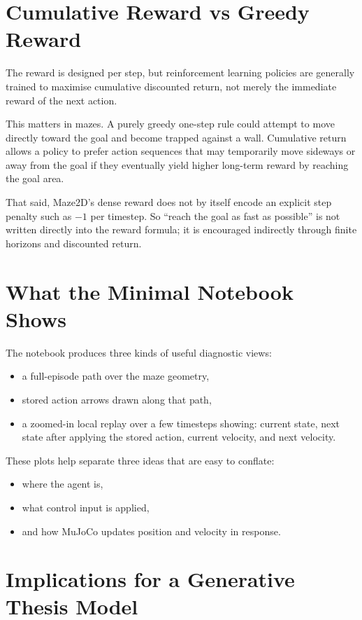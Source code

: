 \documentclass[12pt]{article}
\begin{document}
\section*{Cumulative Reward vs Greedy Reward}

The reward is designed per step, but reinforcement learning policies are generally trained to maximise cumulative discounted return, not merely the immediate reward of the next action.

This matters in mazes. A purely greedy one-step rule could attempt to move directly toward the goal and become trapped against a wall. Cumulative return allows a policy to prefer action sequences that may temporarily move sideways or away from the goal if they eventually yield higher long-term reward by reaching the goal area.

That said, Maze2D's dense reward does not by itself encode an explicit step penalty such as \(-1\) per timestep. So ``reach the goal as fast as possible'' is not written directly into the reward formula; it is encouraged indirectly through finite horizons and discounted return.

\section*{What the Minimal Notebook Shows}

The notebook produces three kinds of useful diagnostic views:

\begin{itemize}[leftmargin=*]
\item a full-episode path over the maze geometry,
\item stored action arrows drawn along that path,
\item a zoomed-in local replay over a few timesteps showing:
  current state,
  next state after applying the stored action,
  current velocity,
  and next velocity.
\end{itemize}

These plots help separate three ideas that are easy to conflate:

\begin{itemize}[leftmargin=*]
\item where the agent is,
\item what control input is applied,
\item and how MuJoCo updates position and velocity in response.
\end{itemize}

\section*{Implications for a Generative Thesis Model}
\end{document}
